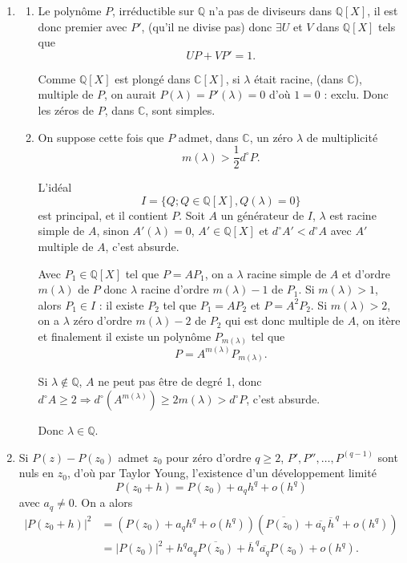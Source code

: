 \begin{enumerate}[label=\arabic*.,leftmargin=2.2em,itemsep=1.1em]
Il reste finalement les conditions
\[
j^{2m}+pj^m+q=0,\qquad\text{et}\qquad j^{4m}+pj^{2m}+q=0,
\]
car
\[
j^{8m}=j^{6m}j^{2m}=(j^3)^{2m}j^{2m}=j^{2m}
\]
et
\[
j^{4m}=j^{3m}j^m=j^m.
\]

\item
\begin{enumerate}[label=\arabic*),leftmargin=2em]
\item Le polynôme $P$, irréductible sur $\mathbb Q$ n'a pas de diviseurs dans $\mathbb Q[X]$, il est donc premier avec $P'$, (qu'il ne divise pas) donc $\exists U$ et $V$ dans $\mathbb Q[X]$ tels que
\[
UP+VP'=1.
\]

Comme $\mathbb Q[X]$ est plongé dans $\mathbb C[X]$, si $\lambda$ était racine, (dans $\mathbb C$), multiple de $P$, on aurait $P(\lambda)=P'(\lambda)=0$ d'où $1=0$ : exclu. Donc les zéros de $P$, dans $\mathbb C$, sont simples.

\item On suppose cette fois que $P$ admet, dans $\mathbb C$, un zéro $\lambda$ de multiplicité
\[
m(\lambda)>\frac12d^\circ P.
\]

L'idéal
\[
I=\{Q;Q\in\mathbb Q[X],Q(\lambda)=0\}
\]
est principal, et il contient $P$. Soit $A$ un générateur de $I$, $\lambda$ est racine simple de $A$, sinon $A'(\lambda)=0$, $A'\in\mathbb Q[X]$ et $d^\circ A'<d^\circ A$ avec $A'$ multiple de $A$, c'est absurde.

Avec $P_1\in\mathbb Q[X]$ tel que $P=AP_1$, on a $\lambda$ racine simple de $A$ et d'ordre $m(\lambda)$ de $P$ donc $\lambda$ racine d'ordre $m(\lambda)-1$ de $P_1$. Si $m(\lambda)>1$, alors $P_1\in I$ : il existe $P_2$ tel que $P_1=AP_2$ et $P=A^2P_2$. Si $m(\lambda)>2$, on a $\lambda$ zéro d'ordre $m(\lambda)-2$ de $P_2$ qui est donc multiple de $A$, on itère et finalement il existe un polynôme $P_{m(\lambda)}$ tel que
\[
P=A^{m(\lambda)}P_{m(\lambda)}.
\]

Si $\lambda\notin\mathbb Q$, $A$ ne peut pas être de degré 1, donc $d^\circ A\ge2\Rightarrow d^\circ(A^{m(\lambda)})\ge2m(\lambda)>d^\circ P$, c'est absurde.

Donc $\lambda\in\mathbb Q$.
\end{enumerate}

\item Si $P(z)-P(z_0)$ admet $z_0$ pour zéro d'ordre $q\ge2$, $P',P'',\ldots,P^{(q-1)}$ sont nuls en $z_0$, d'où par Taylor Young, l'existence d'un développement limité
\[
P(z_0+h)=P(z_0)+a_qh^q+o(h^q)
\]
avec $a_q\ne0$. On a alors
\[
\begin{aligned}
|P(z_0+h)|^2
&=(P(z_0)+a_qh^q+o(h^q))(\overline{P(z_0)}+\overline{a_q}\,\overline h^{\,q}+o(h^q))\\
&=|P(z_0)|^2+h^qa_q\overline{P(z_0)}+\overline h^{\,q}\overline{a_q}P(z_0)+o(h^q).
\end{aligned}
\]


\end{enumerate}
